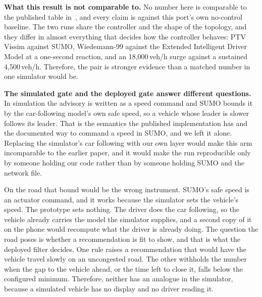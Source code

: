 \noindent\textbf{What this result is not comparable to.} No number here is comparable to the published table in~\cite{self_regulating_cars}, and every claim is against this port's own no-control baseline. The two runs share the controller and the shape of the topology, and they differ in almost everything that decides how the controller behaves: PTV Vissim against SUMO, Wiedemann-99 against the Extended Intelligent Driver Model at a one-second reaction, and an 18{,}000\,veh/h surge against a sustained 4{,}500\,veh/h. Therefore, the pair is stronger evidence than a matched number in one simulator would be.


\noindent\textbf{The simulated gate and the deployed gate answer different questions.} In simulation the advisory is written as a speed command and SUMO bounds it by the car-following model's own safe speed, so a vehicle whose leader is slower follows its leader. That is the semantics the published implementation has and the documented way to command a speed in SUMO, and we left it alone. Replacing the simulator's car following with our own layer would make this arm incomparable to the earlier paper, and it would make the run reproducible only by someone holding our code rather than by someone holding SUMO and the network file.


On the road that bound would be the wrong instrument. SUMO's safe speed is an actuator command, and it works because the simulator sets the vehicle's speed. The prototype sets nothing. The driver does the car following, so the vehicle already carries the model the simulator supplies, and a second copy of it on the phone would recompute what the driver is already doing. The question the road poses is whether a recommendation is fit to show, and that is what the deployed filter decides. One rule raises a recommendation that would have the vehicle travel slowly on an uncongested road. The other withholds the number when the gap to the vehicle ahead, or the time left to close it, falls below the configured minimum. Therefore, neither has an analogue in the simulator, because a simulated vehicle has no display and no driver reading it.
